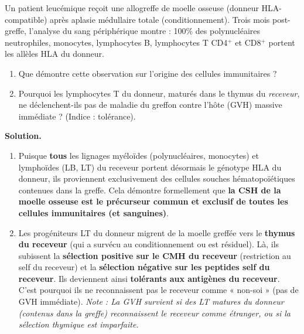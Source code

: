 \documentclass[11pt]{article}
\begin{document}
\begin{exoresolu}
Un patient leucémique reçoit une allogreffe de moelle osseuse (donneur HLA-compatible) après aplasie médullaire totale (conditionnement). Trois mois post-greffe, l'analyse du sang périphérique montre : 100\% des polynucléaires neutrophiles, monocytes, lymphocytes B, lymphocytes T CD4$^+$ et CD8$^+$ portent les allèles HLA du donneur.
\begin{enumerate}
\item Que démontre cette observation sur l'origine des cellules immunitaires ?
\item Pourquoi les lymphocytes T du donneur, maturés dans le thymus du \emph{receveur}, ne déclenchent-ils pas de maladie du greffon contre l'hôte (GVH) massive immédiate ? (Indice : tolérance).
\end{enumerate}
\tcblower
\textbf{Solution.}
\begin{enumerate}
\item Puisque \textbf{tous} les lignages myéloïdes (polynucléaires, monocytes) et lymphoïdes (LB, LT) du receveur portent désormais le génotype HLA du donneur, ils proviennent exclusivement des cellules souches hématopoïétiques contenues dans la greffe. Cela démontre formellement que \textbf{la CSH de la moelle osseuse est le précurseur commun et exclusif de toutes les cellules immunitaires (et sanguines)}.
\item Les progéniteurs LT du donneur migrent de la moelle greffée vers le \textbf{thymus du receveur} (qui a survécu au conditionnement ou est résiduel). Là, ils subissent la \textbf{sélection positive sur le CMH du receveur} (restriction au self du receveur) et la \textbf{sélection négative sur les peptides self du receveur}. Ils deviennent ainsi \textbf{tolérants aux antigènes du receveur}. C'est pourquoi ils ne reconnaissent pas le receveur comme « non-soi » (pas de GVH immédiate). \textit{Note : La GVH survient si des LT matures du donneur (contenus dans la greffe) reconnaissent le receveur comme étranger, ou si la sélection thymique est imparfaite.}
\end{enumerate}
\end{exoresolu}
\end{document}
